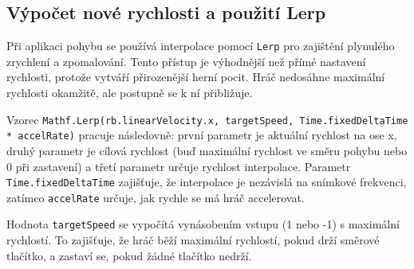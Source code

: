 \subsection{Výpočet nové rychlosti a použití Lerp}

Při aplikaci pohybu se používá interpolace pomocí \texttt{Lerp} pro zajištění plynulého zrychlení a zpomalování. Tento přístup je výhodnější než přímé nastavení rychlosti, protože vytváří přirozenější herní pocit. Hráč nedosáhne maximální rychlosti okamžitě, ale postupně se k ní přibližuje.

Vzorec \texttt{Mathf.Lerp(rb.linearVelocity.x, targetSpeed, Time.fixedDeltaTime * accelRate)} pracuje následovně: první parametr je aktuální rychlost na ose x, druhý parametr je cílová rychlost (buď maximální rychlost ve směru pohybu nebo 0 při zastavení) a třetí parametr určuje rychlost interpolace. Parametr \texttt{Time.fixedDeltaTime} zajišťuje, že interpolace je nezávislá na snímkové frekvenci, zatímco \texttt{accelRate} určuje, jak rychle se má hráč accelerovat.

Hodnota \texttt{targetSpeed} se vypočítá vynásobením vstupu (1 nebo -1) s maximální rychlostí. To zajišťuje, že hráč běží maximální rychlostí, pokud drží směrové tlačítko, a zastaví se, pokud žádné tlačítko nedrží.